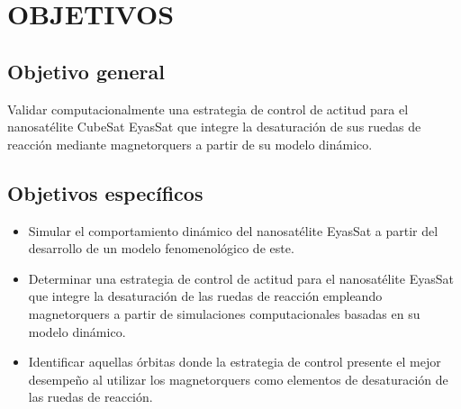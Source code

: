 
\newpage
\section{OBJETIVOS}

\subsection{Objetivo general}



Validar computacionalmente una estrategia de control de actitud para el nanosatélite CubeSat EyasSat que integre la desaturación de sus ruedas de reacción mediante magnetorquers a partir de su modelo dinámico.

\subsection{Objetivos específicos}

\begin{itemize}
\item Simular el comportamiento dinámico del nanosatélite EyasSat a partir del desarrollo de un modelo fenomenológico de este.
\item Determinar una estrategia de control de actitud para el nanosatélite EyasSat que integre la desaturación de las ruedas de reacción empleando magnetorquers a partir de simulaciones computacionales basadas en su modelo dinámico. 
\item Identificar aquellas órbitas donde la estrategia de control presente el mejor desempeño al utilizar los magnetorquers como elementos de desaturación de las ruedas de reacción.

\end{itemize}


